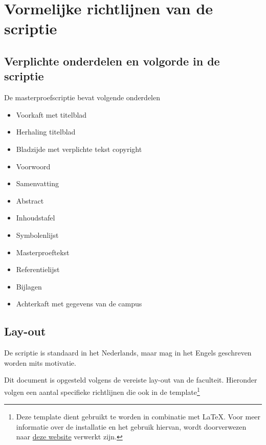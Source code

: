 
\chapter{Vormelijke richtlijnen van de scriptie}

\section{Verplichte onderdelen en volgorde in de scriptie}

De masterproefscriptie bevat volgende onderdelen

\begin{itemize}
\item	Voorkaft met titelblad
\item Herhaling titelblad
\item	Bladzijde met verplichte tekst copyright
\item	Voorwoord
\item	Samenvatting
\item	Abstract
\item	Inhoudstafel
\item	Symbolenlijst
\item	Masterproeftekst
\item	Referentielijst
\item	Bijlagen
\item	Achterkaft met gegevens van de campus
\end{itemize}

\section{Lay-out}
De scriptie is standaard in het Nederlands, maar mag in het Engels geschreven worden mits motivatie. 

Dit document is opgesteld volgens de vereiste lay-out van de faculteit. Hieronder volgen een aantal specifieke richtlijnen die ook in de template\footnote{Deze template dient gebruikt te worden in combinatie met LaTeX. Voor meer informatie over de installatie en het gebruik hiervan, wordt doorverwezen naar \href{https://www.latex-project.org/}{deze website} verwerkt zijn.}

